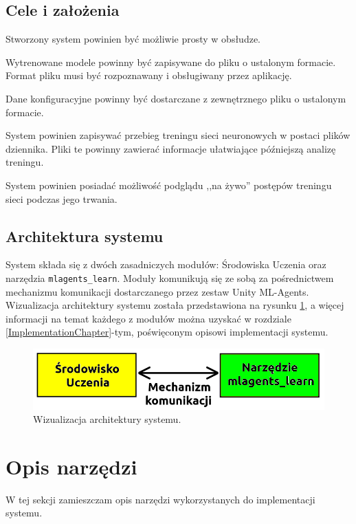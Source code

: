 \subsection{Cele i założenia}
\begin{enumerate*}
\item Stworzony system powinien być możliwie prosty w obsłudze.
\item Wytrenowane modele powinny być zapisywane do pliku o ustalonym formacie. Format pliku musi być rozpoznawany i obsługiwany przez aplikację.
\item Dane konfiguracyjne powinny być dostarczane z zewnętrznego pliku o ustalonym formacie.
\item System powinien zapisywać przebieg treningu sieci neuronowych w postaci plików dziennika. Pliki te powinny zawierać informacje ułatwiające późniejszą analizę treningu.
\item System powinien posiadać możliwość podglądu ,,na żywo'' postępów treningu sieci podczas jego trwania.
\end{enumerate*}

\subsection{Architektura systemu}
System składa się z dwóch zasadniczych modułów: Środowiska Uczenia oraz narzędzia \texttt{mlagents\_learn}. Moduły komunikują się ze sobą za pośrednictwem mechanizmu komunikacji dostarczanego przez zestaw Unity ML-Agents. Wizualizacja architektury systemu została przedstawiona na rysunku \ref{SystemArchitecture}, a więcej informacji na temat każdego z modułów można uzyskać w rozdziale \ref{ImplementationChapter}-tym, poświęconym opisowi implementacji systemu. \\

\begin{figure}[h]
\begin{center}
\includegraphics[width=15cm]{resources/figures/system_architecture.png}
\caption{Wizualizacja architektury systemu.}
\label{SystemArchitecture}
\end{center}
\end{figure}

\section{Opis narzędzi}
W tej sekcji zamieszczam opis narzędzi wykorzystanych do implementacji systemu.
